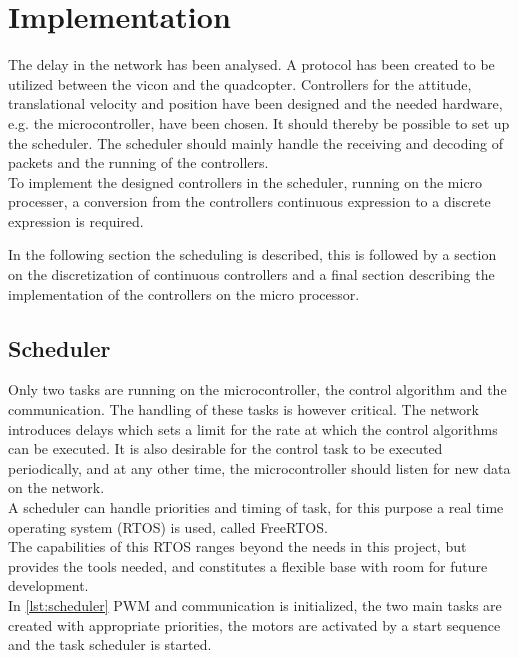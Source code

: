 \chapter{Implementation}
The delay in the network has been analysed. A protocol has been created to be utilized between the vicon and the quadcopter. Controllers for the attitude, translational velocity and position have been designed and the needed hardware, e.g. the microcontroller, have been chosen. It should thereby be possible to set up the scheduler. The scheduler should mainly handle the receiving and decoding of packets and the running of the controllers. \\ To implement the designed controllers in the scheduler, running on the micro processer, a conversion from the controllers continuous expression to a discrete expression is required.

In the following section the scheduling is described, this is followed by a section on the discretization of continuous controllers and a final section describing the implementation of the controllers on the micro processor.

\section{Scheduler}
Only two tasks are running on the microcontroller, the control algorithm and the communication. The handling of these tasks is however critical. The network introduces delays which sets a limit for the rate at which the control algorithms can be executed. It is also desirable for the control task to be executed periodically, and at any other time, the microcontroller should listen for new data on the network.\\
A scheduler can handle priorities and timing of task, for this purpose a real time operating system (RTOS) is used, called FreeRTOS.\\
The capabilities of this RTOS ranges beyond the needs in this project, but provides the tools needed, and constitutes a flexible base with room for future development.\\
In \autoref{lst:scheduler} PWM and communication is initialized, the two main tasks are created with appropriate priorities, the motors are activated by a start sequence and the task scheduler is started.

